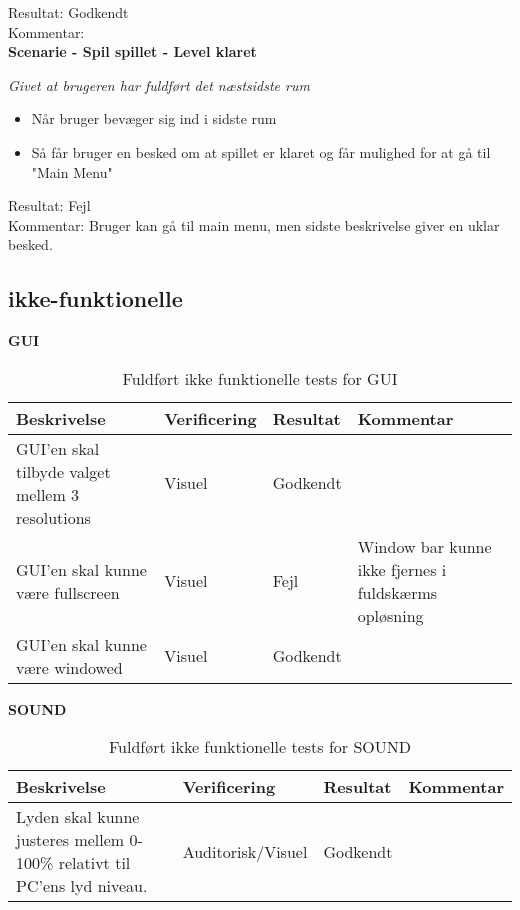 Resultat: Godkendt\\
Kommentar:\\

\bf{Scenarie - Spil spillet - Level klaret}

\it{Givet at brugeren har fuldført det næstsidste rum}

\begin{itemize}
  \item Når bruger bevæger sig ind i sidste rum
  \item Så får bruger en besked om at spillet er klaret og får mulighed for at gå til "Main Menu"
\end{itemize}

Resultat: Fejl\\
Kommentar: Bruger kan gå til main menu, men sidste beskrivelse giver en uklar besked.\\

\subsection{ikke-funktionelle}
\bf{GUI}
\begin{table}[H]
\caption{ Fuldført ikke funktionelle tests for GUI}
\label{tab:}
\begin{tabular}{|p{3cm}|p{3cm}|p{3cm}|p{3cm}|}
\hline
Beskrivelse & Verificering & Resultat & Kommentar \\
\hline
GUI'en skal tilbyde valget mellem 3 resolutions & Visuel & Godkendt & \\
\hline
GUI'en skal kunne være fullscreen & Visuel & Fejl & Window bar kunne ikke fjernes i fuldskærms opløsning\\
\hline
GUI'en skal kunne være windowed & Visuel & Godkendt & \\
\hline
\end{tabular}
\end{table}

\bf{SOUND}
\begin{table}[H]
\caption{ Fuldført ikke funktionelle tests for SOUND}
\label{tab:}
\begin{tabular}{|p{3cm}|p{3cm}|p{3cm}|p{3cm}|}
\hline
Beskrivelse & Verificering & Resultat & Kommentar \\
\hline
Lyden skal kunne justeres mellem 0-100\% relativt til PC'ens lyd niveau. & Auditorisk/Visuel & Godkendt & \\
\hline
\end{tabular}
\end{table}

